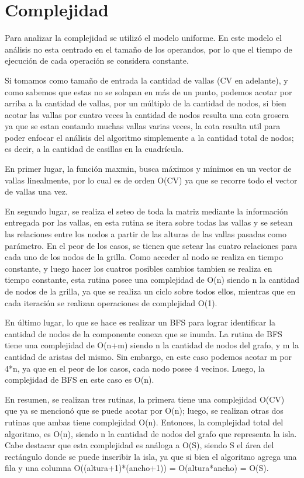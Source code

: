 \documentclass[a4paper, 12pt]{article}
\begin{document}
\section*{Complejidad}
Para analizar la complejidad se utiliz\'o el modelo uniforme. En este modelo el an\'alisis no esta centrado en el tama\~{n}o de los operandos, por lo que el tiempo de ejecuci\'on de cada operaci\'on se considera constante.

Si tomamos como tama\~no de entrada la cantidad de vallas (CV en adelante), y como sabemos que estas no se solapan en m\'as de un punto, podemos acotar por arriba a la cantidad de vallas, por un m\'ultiplo de la cantidad de nodos, si bien acotar las vallas por cuatro veces la cantidad de nodos resulta una cota grosera ya que se estan contando muchas vallas varias veces, la cota resulta util para poder enfocar el an\'alisis del algoritmo simplemente a la cantidad total de nodos; es decir, a la cantidad de casillas en la cuadr\'icula.

 
En primer lugar, la funci\'on maxmin, busca m\'aximos y m\'inimos en un vector de vallas linealmente, por lo cual es de orden O(CV) ya que se recorre todo el vector de vallas una vez.

En segundo lugar, se realiza el seteo de toda la matriz mediante la informaci\'on entregada por las vallas, en esta rutina se itera sobre todas las vallas y se setean las relaciones entre los nodos a partir de las alturas de las vallas pasadas como par\'ametro. En el peor de los casos, se tienen que setear las cuatro relaciones para cada uno de los nodos de la grilla. Como acceder al nodo se realiza en tiempo constante, y luego hacer los cuatros posibles cambios tambien se realiza en tiempo constante, esta rutina posee una complejidad de O(n) siendo n la cantidad de nodos de la grilla, ya que se realiza un ciclo sobre todos ellos, mientras que en cada iteraci\'on se realizan operaciones de complejidad O(1).

En \'ultimo lugar, lo que se hace es realizar un BFS para lograr identificar la cantidad de nodos de la componente conexa que se inunda. La rutina de BFS tiene una complejidad de O(n+m) siendo n la cantidad de nodos del grafo, y m la cantidad de aristas del mismo. Sin embargo, en este caso podemos acotar m por 4*n, ya que en el peor de los casos, cada nodo posee 4 vecinos. Luego, la complejidad de BFS en este caso es O(n).

En resumen, se realizan tres rutinas, la primera tiene una complejidad O(CV) que ya se mencion\'o que se puede acotar por O(n); luego, se realizan otras dos rutinas que ambas tiene complejidad O(n). Entonces, la complejidad total del algoritmo, es O(n), siendo n la cantidad de nodos del grafo que representa la isla. Cabe destacar que esta complejidad es an\'aloga a O(S), siendo S el \'area del rect\'angulo donde se puede inscribir la isla, ya que si bien el algoritmo agrega una fila y una columna O((altura+1)*(ancho+1)) = O(altura*ancho) = O(S).
\end{document}
